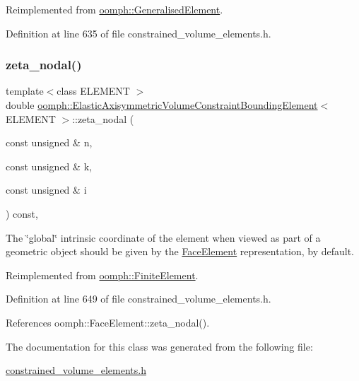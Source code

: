 Reimplemented from \hyperlink{classoomph_1_1GeneralisedElement_a6ae09fc0d68e4309ac1b03583d252845}{oomph\+::\+Generalised\+Element}.



Definition at line 635 of file constrained\+\_\+volume\+\_\+elements.\+h.

\mbox{\label{classoomph_1_1ElasticAxisymmetricVolumeConstraintBoundingElement_a8fe8843e542a626dd374cc4cd6850bcb}} 
\subsubsection{\texorpdfstring{zeta\+\_\+nodal()}{zeta\_nodal()}}
{\footnotesize\ttfamily template$<$class E\+L\+E\+M\+E\+NT $>$ \\
double \hyperlink{classoomph_1_1ElasticAxisymmetricVolumeConstraintBoundingElement}{oomph\+::\+Elastic\+Axisymmetric\+Volume\+Constraint\+Bounding\+Element}$<$ E\+L\+E\+M\+E\+NT $>$\+::zeta\+\_\+nodal (\begin{DoxyParamCaption}\item[{const unsigned \&}]{n,  }\item[{const unsigned \&}]{k,  }\item[{const unsigned \&}]{i }\end{DoxyParamCaption}) const\hspace{0.3cm}{\ttfamily [inline]}, {\ttfamily [virtual]}}



The \char`\"{}global\char`\"{} intrinsic coordinate of the element when viewed as part of a geometric object should be given by the \hyperlink{classoomph_1_1FaceElement}{Face\+Element} representation, by default. 



Reimplemented from \hyperlink{classoomph_1_1FiniteElement_a849561c5fbcbc07dc49d2dc6cca68559}{oomph\+::\+Finite\+Element}.



Definition at line 649 of file constrained\+\_\+volume\+\_\+elements.\+h.



References oomph\+::\+Face\+Element\+::zeta\+\_\+nodal().



The documentation for this class was generated from the following file\+:\begin{DoxyCompactItemize}
\item 
\hyperlink{constrained__volume__elements_8h}{constrained\+\_\+volume\+\_\+elements.\+h}\end{DoxyCompactItemize}

